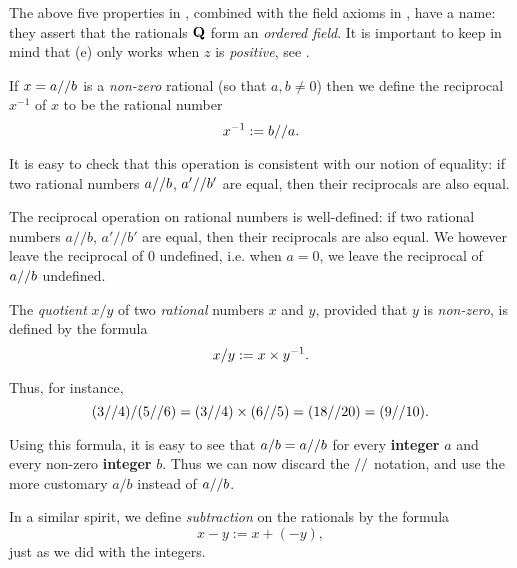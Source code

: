 \begin{remark} \label{remark 4.2.10}
The above five properties in , combined with the field axioms in , have a name:
they assert that the rationals \(\mathbf{Q}\) form an \emph{ordered field}.
It is important to keep in mind that (e) only works when \(z\) is \emph{positive}, see .
\end{remark}

\begin{definition} [Reciprocal] \label{def 4.2.11}
If \(x = a \text{//} b\) is a \emph{non-zero} rational (so that \(a, b \neq 0\)) then we define the reciprocal \(x^{-1}\) of \(x\) to be the rational number
\[
    x^{-1} := b \text{//} a.
\]
\end{definition}

It is easy to check that this operation is consistent with our notion of equality: if two rational numbers \(a \text{//} b\), \(a' \text{//} b'\) are equal, then their reciprocals are also equal.
\begin{additional corollary} \label{ac 4.2.9}
The reciprocal operation on rational numbers is well-defined:
if two rational numbers \(a // b\), \(a' // b'\) are equal, then their reciprocals are also equal.
We however leave the reciprocal of \(0\) undefined, i.e. when \(a = 0\), we leave the reciprocal of \(a \text{//} b\) undefined.
\end{additional corollary}

\begin{definition} [Quotient] \label{def 4.2.12}
The \emph{quotient} \(x / y\) of two \emph{rational} numbers \(x\) and \(y\), provided that \(y\) is \emph{non-zero}, is defined by the formula
\[
    x / y := x \times y^{-1}.
\]
\end{definition}
Thus, for instance,
\[
    (3 \text{//} 4) / (5 \text{//} 6) = (3 \text{//} 4) \times (6 \text{//} 5) = (18 \text{//} 20) = (9 \text{//} 10).
\]

Using this formula, it is easy to see that \(a / b = a \text{//} b\) for every \textbf{integer} \(a\) and every non-zero \textbf{integer} \(b\).
Thus we can now discard the \(\text{//}\) notation, and use the more customary \(a / b\) instead of \(a \text{//} b\).

\begin{definition} [Subtraction] \label{def 4.2.13}
In a similar spirit, we define \emph{subtraction} on the rationals by the formula
\[
    x - y := x + (-y),
\]
just as we did with the integers.
\end{definition}

\exercisesection

